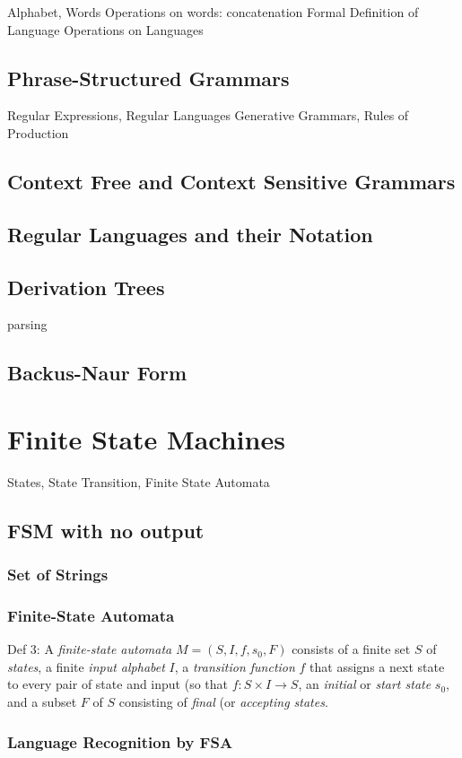 \documentclass[11pt]{book} %
\theoremstyle {definition}
\theoremstyle {remark}
\begin{document}
Alphabet, Words
Operations on words: concatenation
Formal Definition of Language
Operations on Languages
    \subsection {Phrase-Structured Grammars}
Regular Expressions, Regular Languages
Generative Grammars, Rules of Production
    \subsection {Context Free and Context Sensitive Grammars}
    \subsection {Regular Languages and their Notation}
    \subsection {Derivation Trees}
    parsing
    \subsection {Backus-Naur Form}
    
\section {Finite State Machines}
States, State Transition, Finite State Automata
    \subsection {FSM with no output}
        \subsubsection {Set of Strings}
        \subsubsection {Finite-State Automata}
        Def 3: A \textit{finite-state automata} $M=(S,I,f,s_0,F)$ consists of a finite set $S$ of \textit{states}, a finite \textit{input alphabet} $I$, a \textit{transition function} $f$ that assigns a next state to every pair of state and input (so that $f:S \times I \rightarrow S$, an \textit{initial} or \textit{start state} $s_0$, and a subset $F$ of $S$ consisting of \textit{final} (or \textit{accepting states}.
        
        \subsubsection {Language Recognition by FSA}
\end{document}

